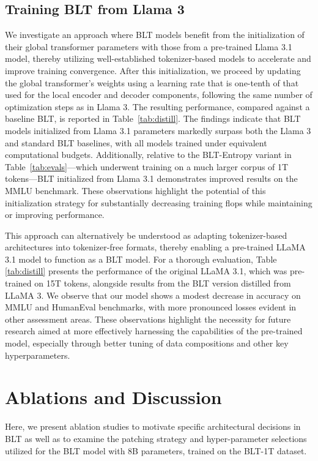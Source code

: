 \subsection{Training {\textsc BLT} from Llama 3}
\label{sec:distillation}
We investigate an approach where {\textsc BLT} models benefit from the initialization of their global transformer parameters with those from a pre-trained Llama 3.1 model, thereby utilizing well-established tokenizer-based models to accelerate and improve training convergence. After this initialization, we proceed by updating the global transformer’s weights using a learning rate that is one-tenth of that used for the local encoder and decoder components, following the same number of optimization steps as in Llama 3. The resulting performance, compared against a baseline {\textsc BLT}, is reported in Table~\ref{tab:distill}. The findings indicate that {\textsc BLT} models initialized from Llama 3.1 parameters markedly surpass both the Llama 3 and standard {\textsc BLT} baselines, with all models trained under equivalent computational budgets. Additionally, relative to the {\textsc BLT}-Entropy variant in Table~\ref{tab:evals}—which underwent training on a much larger corpus of 1T tokens—{\textsc BLT} initialized from Llama 3.1 demonstrates improved results on the MMLU benchmark. These observations highlight the potential of this initialization strategy for substantially decreasing training flops while maintaining or improving performance.

This approach can alternatively be understood as adapting tokenizer-based architectures into tokenizer-free formats, thereby enabling a pre-trained LLaMA 3.1 model to function as a {\textsc BLT} model. For a thorough evaluation, Table \ref{tab:distill} presents the performance of the original LLaMA 3.1, which was pre-trained on 15T tokens, alongside results from the {\textsc BLT} version distilled from LLaMA 3. We observe that our model shows a modest decrease in accuracy on MMLU and HumanEval benchmarks, with more pronounced losses evident in other assessment areas. These observations highlight the necessity for future research aimed at more effectively harnessing the capabilities of the pre-trained model, especially through better tuning of data compositions and other key hyperparameters.

\section{Ablations and Discussion}
\label{section:ablations}
Here, we present ablation studies to motivate specific architectural decisions in {\textsc BLT} as well as to examine the patching strategy and hyper-parameter selections utilized for the {\textsc BLT} model with 8B parameters, trained on the {\textsc BLT}-1T dataset.

